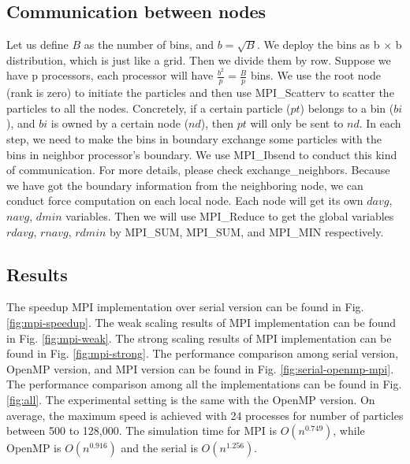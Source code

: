 \documentclass[12pt]{article}
\begin{document}
\subsection{Communication between nodes}
Let us define $B$ as the number of bins, and $b = \sqrt{B}$. 
We deploy the bins as b $\times$ b distribution, which is just like a grid. Then we divide them by row. Suppose we have p processors, each processor will have $\frac{b^2}{p} = \frac{B}{p}$ bins.
We use the root node (rank is zero) to initiate the particles and then use MPI\_Scatterv to scatter the particles to all the nodes. Concretely, if a certain particle ($pt$) belongs to a bin ($bi$), and $bi$ is owned by a certain node ($nd$), then $pt$ will only be sent to $nd$.
In each step, we need to make the bins in boundary exchange some particles with the bins in neighbor processor's boundary.  We use MPI\_Ibsend to conduct this kind of communication. For more details, please check exchange\_neighbors.
Because we have got the boundary information from the neighboring node, we can conduct force computation on each local node.
Each node will get its own $davg$,  $navg$, $dmin$ variables. Then we will use MPI\_Reduce to get the global variables $rdavg$,  $rnavg$, $rdmin$ by MPI\_SUM, MPI\_SUM, and MPI\_MIN respectively.

\subsection{Results}
The speedup MPI implementation over serial version can be found in Fig. \ref{fig:mpi-speedup}.
The weak scaling results of MPI implementation can be found in Fig. \ref{fig:mpi-weak}.
The strong scaling results of MPI implementation can be found in Fig. \ref{fig:mpi-strong}.
The performance comparison among serial version, OpenMP version, and MPI version can be found in Fig. \ref{fig:serial-openmp-mpi}.
The performance comparison among all the implementations can be found in Fig. \ref{fig:all}.
The experimental setting is the same with the OpenMP version.  On average, the maximum speed is achieved with 24 processes for number of particles between 500 to 128,000. The simulation time for MPI is $O(n^{0.749})$, while OpenMP is $O(n^{0.916})$ and the serial is $O(n^{1.256})$. 
\end{document}

